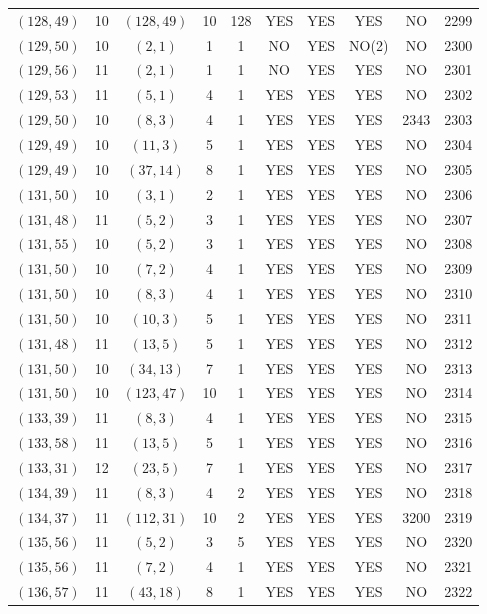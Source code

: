 \begin{longtable}{|c|c|c|c|c|c|c|c|c|c|}
$(128, 49)$ & 10 & $(128, 49)$ & 10 & 128 & YES & YES & YES & NO & 2299\\
$(129, 50)$ & 10 & $(2, 1)$ & 1 & 1 & NO & YES & NO(2) & NO & 2300\\
$(129, 56)$ & 11 & $(2, 1)$ & 1 & 1 & NO & YES & YES & NO & 2301\\
$(129, 53)$ & 11 & $(5, 1)$ & 4 & 1 & YES & YES & YES & NO & 2302\\
$(129, 50)$ & 10 & $(8, 3)$ & 4 & 1 & YES & YES & YES & 2343 & 2303\\
$(129, 49)$ & 10 & $(11, 3)$ & 5 & 1 & YES & YES & YES & NO & 2304\\
$(129, 49)$ & 10 & $(37, 14)$ & 8 & 1 & YES & YES & YES & NO & 2305\\
$(131, 50)$ & 10 & $(3, 1)$ & 2 & 1 & YES & YES & YES & NO & 2306\\
$(131, 48)$ & 11 & $(5, 2)$ & 3 & 1 & YES & YES & YES & NO & 2307\\
$(131, 55)$ & 10 & $(5, 2)$ & 3 & 1 & YES & YES & YES & NO & 2308\\
$(131, 50)$ & 10 & $(7, 2)$ & 4 & 1 & YES & YES & YES & NO & 2309\\
$(131, 50)$ & 10 & $(8, 3)$ & 4 & 1 & YES & YES & YES & NO & 2310\\
$(131, 50)$ & 10 & $(10, 3)$ & 5 & 1 & YES & YES & YES & NO & 2311\\
$(131, 48)$ & 11 & $(13, 5)$ & 5 & 1 & YES & YES & YES & NO & 2312\\
$(131, 50)$ & 10 & $(34, 13)$ & 7 & 1 & YES & YES & YES & NO & 2313\\
$(131, 50)$ & 10 & $(123, 47)$ & 10 & 1 & YES & YES & YES & NO & 2314\\
$(133, 39)$ & 11 & $(8, 3)$ & 4 & 1 & YES & YES & YES & NO & 2315\\
$(133, 58)$ & 11 & $(13, 5)$ & 5 & 1 & YES & YES & YES & NO & 2316\\
$(133, 31)$ & 12 & $(23, 5)$ & 7 & 1 & YES & YES & YES & NO & 2317\\
$(134, 39)$ & 11 & $(8, 3)$ & 4 & 2 & YES & YES & YES & NO & 2318\\
$(134, 37)$ & 11 & $(112, 31)$ & 10 & 2 & YES & YES & YES & 3200 & 2319\\
$(135, 56)$ & 11 & $(5, 2)$ & 3 & 5 & YES & YES & YES & NO & 2320\\
$(135, 56)$ & 11 & $(7, 2)$ & 4 & 1 & YES & YES & YES & NO & 2321\\
$(136, 57)$ & 11 & $(43, 18)$ & 8 & 1 & YES & YES & YES & NO & 2322\\

\end{longtable}
